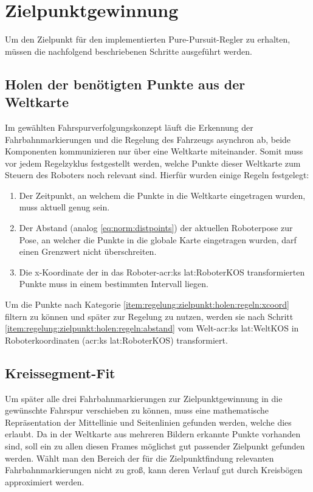 \section{Zielpunktgewinnung \dcsecondauthorshort}
Um den Zielpunkt für den implementierten \glqq Pure-Pursuit\grqq -Regler zu erhalten, müssen die nachfolgend beschriebenen Schritte ausgeführt werden.

\subsection{Holen der benötigten Punkte aus der Weltkarte}
Im gewählten Fahrspurverfolgungskonzept läuft die Erkennung der Fahrbahnmarkierungen und die Regelung des Fahrzeugs asynchron ab, beide Komponenten kommunizieren nur über eine Weltkarte miteinander. Somit muss vor jedem Regelzyklus festgestellt werden, welche Punkte dieser Weltkarte zum Steuern des Roboters noch relevant sind. Hierfür wurden einige Regeln festgelegt:
\begin{enumerate}
\item
Der Zeitpunkt, an welchem die Punkte in die Weltkarte eingetragen wurden, muss aktuell genug sein.
\item \label{item:regelung:zielpunkt:holen:regeln:abstand}
Der Abstand (analog \ref{eq:norm:distpoints}) der aktuellen Roboterpose zur Pose, an welcher die Punkte in die globale Karte eingetragen wurden, darf einen Grenzwert nicht überschreiten.
\item \label{item:regelung:zielpunkt:holen:regeln:xcoord}
Die x-Koordinate der in das Roboter-\gls{acr:ks} \gls{lat:RoboterKOS} transformierten Punkte muss in einem bestimmten Intervall liegen.
\end{enumerate}
Um die Punkte nach Kategorie \ref{item:regelung:zielpunkt:holen:regeln:xcoord} filtern zu können und später zur Regelung zu nutzen, werden sie nach Schritt \ref{item:regelung:zielpunkt:holen:regeln:abstand} vom Welt-\gls{acr:ks} \gls{lat:WeltKOS} in Roboterkoordinaten (\gls{acr:ks} \gls{lat:RoboterKOS}) transformiert.

\subsection{Kreissegment-Fit} \label{regelung:zielpunkt:kreissegment-fit}
Um später alle drei Fahrbahnmarkierungen zur Zielpunktgewinnung in die gewünschte Fahrspur verschieben zu können, muss eine mathematische Repräsentation der Mittellinie und Seitenlinien gefunden werden, welche dies erlaubt. Da in der Weltkarte aus mehreren Bildern erkannte Punkte vorhanden sind, soll ein zu allen diesen Frames möglichst gut passender Zielpunkt gefunden werden. Wählt man den Bereich der für die Zielpunktfindung relevanten Fahrbahnmarkierungen nicht zu groß, kann deren Verlauf gut durch Kreisbögen approximiert werden. 

